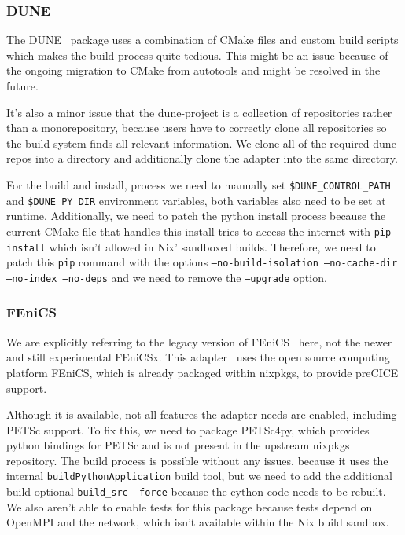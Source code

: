 \documentclass{eceasst}
\begin{document}
\subsubsection{DUNE}

The DUNE~\cite{bastian2020dune} package uses a combination of CMake files and custom build scripts which makes the build process quite tedious.
This might be an issue because of the ongoing migration to CMake from autotools and might be resolved in the future.

It's also a minor issue that the dune-project is a collection of repositories rather than a monorepository, because users have to correctly clone all repositories so the build system finds all relevant information.
We clone all of the required dune repos into a directory and additionally clone the adapter into the same directory.

For the build and install, process we need to manually set \texttt{\$DUNE\_CONTROL\_PATH} and \texttt{\$DUNE\_PY\_DIR} environment variables, both variables also need to be set at runtime.
Additionally, we need to patch the python install process because the current CMake file that handles this install tries to access the internet with \texttt{pip install} which isn't allowed in Nix' sandboxed builds.
Therefore, we need to patch this \texttt{pip} command with the options \texttt{--no-build-isolation --no-cache-dir --no-index --no-deps} and we need to remove the \texttt{--upgrade} option.\\

\subsubsection{FEniCS}

We are explicitly referring to the legacy version of FEniCS~\cite{fenics} here, not the newer and still experimental FEniCSx.
This adapter~\cite{Rodenberg2021} uses the open source computing platform FEniCS, which is already packaged within nixpkgs, to provide preCICE support.

Although it is available, not all features the adapter needs are enabled, including PETSc support.
To fix this, we need to package PETSc4py, which provides python bindings for PETSc and is not present in the upstream nixpkgs repository.
The build process is possible without any issues, because it uses the internal \texttt{buildPythonApplication} build tool, but we need to add the additional build optional \texttt{build\_src --force} because the cython code needs to be rebuilt.
We also aren't able to enable tests for this package because tests depend on OpenMPI and the network, which isn't available within the Nix build sandbox.
\end{document}
